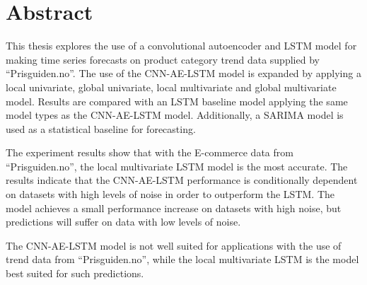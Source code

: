 \section*{Abstract}
\label{section:Abstract}





This thesis explores the use of a convolutional autoencoder and LSTM model for making time series
forecasts on product category trend data supplied by ``Prisguiden.no''.
The use of the CNN-AE-LSTM model is expanded by applying a local univariate, global univariate, local multivariate and global multivariate model.
Results are compared with an LSTM baseline model applying the same model types as the CNN-AE-LSTM model.
Additionally, a SARIMA model is used as a statistical baseline for forecasting.


The experiment results show that with the E-commerce data from ``Prisguiden.no'',
the local multivariate LSTM model is the most accurate.
The results indicate that the CNN-AE-LSTM performance is conditionally dependent on datasets with high levels of noise in order to outperform the LSTM.
The model achieves a small performance increase on datasets with high noise, but predictions will suffer
on data with low levels of noise.

The CNN-AE-LSTM model is not well suited for applications with the use of trend data from ``Prisguiden.no'',
while the local multivariate LSTM is the model best suited for such predictions.







